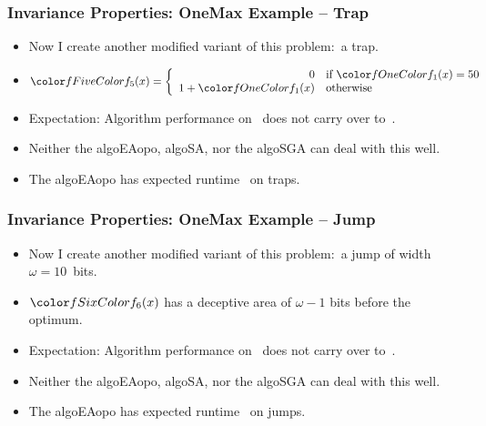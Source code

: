 \documentclass[aspectratio=169,mathserif,notheorems]{beamer}%
\begin{document}
\begin{frame}%
\frametitle{Invariance Properties: OneMax Example -- Trap}%
\parbox{0.415\paperwidth}{%
\begin{itemize}%
\item Now I create another modified variant of this problem:~a trap\cite{DJW2002OTAOTOPOEA,NB2003AAOTBOSEAOTF}.%
\item<2-> \mbox{$\fn{5}(x)=\left\{\begin{array}{rl}0&\textnormal{if~}\fn{1}(x)=50\\1+\fn{1}(x)&\textnormal{otherwise}\end{array}\right.$\hspace{-5em}}%
\item<4-> Expectation: Algorithm performance on~ does not carry over to~.
\item<5-> Neither the \gls{algoEAopo}, \gls{algoSA}, nor the \gls{algoSGA} can deal with this well.%
\item<6-> The \gls{algoEAopo} has expected runtime~ on traps\cite{DJW2002OTAOTOPOEA}.%
\end{itemize}%
}%
%
%
%
\end{frame}%
%
\begin{frame}%
\frametitle{Invariance Properties: OneMax Example -- Jump}%
\parbox{0.415\paperwidth}{%
\begin{itemize}%
\item Now I create another modified variant of this problem:~a jump of width~$\omega=10$~bits.%
\item<2-> $\fn{6}(x)$ has a deceptive area of $\omega-1$ bits before the optimum.%
\item<3-> Expectation: Algorithm performance on~ does not carry over to~.%
\item<4-> Neither the \gls{algoEAopo}, \gls{algoSA}, nor the \gls{algoSGA} can deal with this well.%
\item<5-> The \gls{algoEAopo} has expected runtime~ on jumps\cite{DJW2002OTAOTOPOEA}.%
\end{itemize}%
}%
%
\end{frame}%
\end{document}
